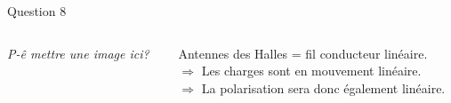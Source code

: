 \documentclass{beamer}
\begin{document}
\begin{frame}{Question 8}
	\begin{columns}
		\begin{column}{0.40\textwidth}
			\begin{center}
			\emph{P-ê mettre une image ici?}
    		\end{center}
    	\end{column}
    	\begin{column}{0.40\textwidth}
	Antennes des Halles = fil conducteur linéaire.\\[0.5em]
	
	$\Rightarrow$ Les charges sont en mouvement linéaire.\\[0.5em]
	
	$\Rightarrow$ La polarisation sera donc également linéaire.
    	\end{column}
	\end{columns}	
\end{frame}
\end{document}
